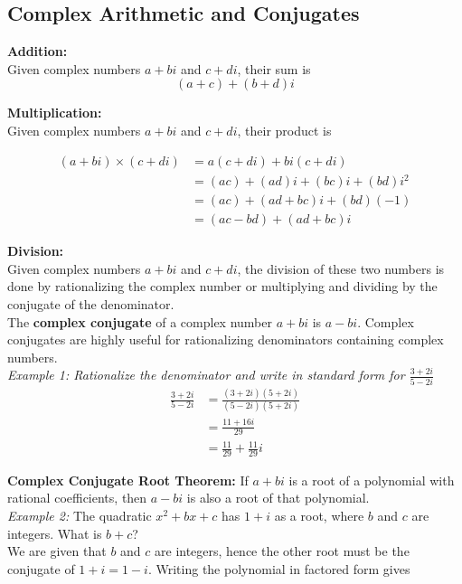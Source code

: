     \subsection{Complex Arithmetic and Conjugates}
        \textbf{Addition:} \\
        Given complex numbers $a+bi$ and $c+di$, their sum is \\
        \begin{equation*}
            (a+c) + (b+d)i
        \end{equation*}

        \noindent \textbf{Multiplication:} \\
        Given complex numbers $a+bi$ and $c+di$, their product is

        \begin{align*}
            (a+bi) \times (c+di) &= a(c+di)+bi(c+di) \\
            &= (ac) + (ad)i + (bc)i + (bd)i^2 \\
            &= (ac) + (ad+bc)i + (bd)(-1) \\
            &= (ac-bd) + (ad+bc)i
        \end{align*}

        \noindent \textbf{Division:} \\
        Given complex numbers $a+bi$ and $c+di$, the division of these two numbers is done by
        rationalizing the complex number or multiplying and dividing by the conjugate of the
        denominator. \\

        \noindent The \textbf{complex conjugate} of a complex number $a+bi$ is $a-bi$.
        Complex conjugates are highly useful for rationalizing denominators containing complex
        numbers. \\

        \noindent \textit{Example 1: Rationalize the denominator and write in standard form for
        $\frac{3+2i}{5-2i}$} \\

        \begin{align*}
            \frac{3+2i}{5-2i} &= \frac{(3+2i)(5+2i)}{(5-2i)(5+2i)} \\
            &= \frac{11+16i}{29} \\
            &= \frac{11}{29} + \frac{11}{29}i
        \end{align*}

        \noindent \textbf{Complex Conjugate Root Theorem:} If $a+bi$ is a root of a polynomial
        with rational coefficients, then $a-bi$ is also a root of that polynomial. \\
        \textit{Example 2:} The quadratic $x^2+bx+c$ has $1+i$ as a root, where $b$ and $c$ are
        integers. What is $b+c$? \\
        We are given that $b$ and $c$ are integers, hence the other root must be the conjugate
        of $1+i=1-i$. Writing the polynomial in factored form gives \\

